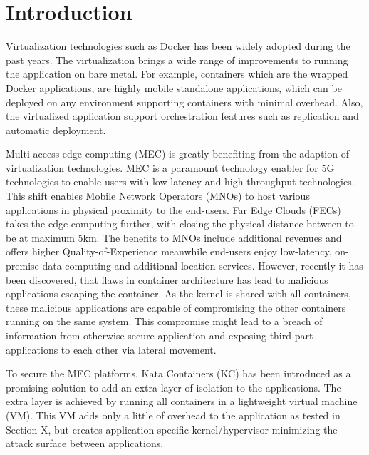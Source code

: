 \chapter{Introduction}
\label{chapter:intro}



Virtualization technologies such as Docker has been widely adopted during the past years. The virtualization brings a wide range of improvements to running the application on bare metal. For example, containers which are the wrapped Docker applications, are highly mobile standalone applications, which can be deployed on any environment supporting containers with minimal overhead. Also, the virtualized application support orchestration features such as replication and automatic deployment.

Multi-access edge computing (MEC) is greatly benefiting from the adaption of virtualization technologies. MEC is a paramount technology enabler for 5G technologies to enable users with low-latency and high-throughput technologies. This shift enables Mobile Network Operators (MNOs) to host various applications in physical proximity to the end-users. Far Edge Clouds (FECs) takes the edge computing further, with closing the physical distance between to be at maximum 5km. The benefits to MNOs include additional revenues and offers higher Quality-of-Experience meanwhile end-users enjoy low-latency, on-premise data computing and additional location services. However, recently it has been discovered, that flaws in container architecture has lead to malicious applications escaping the container. As the kernel is shared with all containers, these malicious applications are capable of compromising the other containers running on the same system. This compromise might lead to a breach of information from otherwise secure application and exposing third-part applications to each other via lateral movement.

To secure the MEC platforms, Kata Containers (KC) \cite{KataContainers} has been introduced as a promising solution to add an extra layer of isolation to the applications. The extra layer is achieved by running all containers in a lightweight virtual machine (VM). This VM adds only a little of overhead to the application as tested in Section X, but creates application specific kernel/hypervisor minimizing the attack surface between applications.

